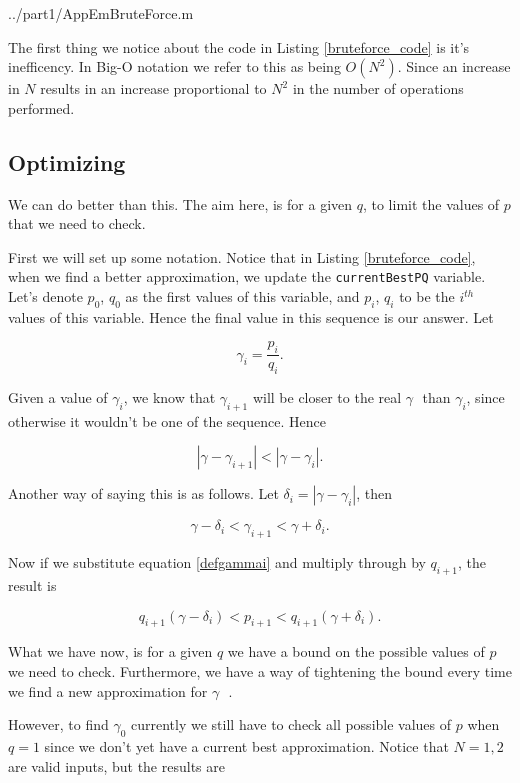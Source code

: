 \documentclass[10pt]{article}
\newcommand*{\gam}{$\gamma \text{ }$}
\newcommand*{\gami}{$\gamma_{i}$}
\begin{document}
   {../part1/AppEmBruteForce.m}

The first thing we notice about the code in Listing \ref{bruteforce_code} is it's inefficency. In Big-O notation we refer to this as being $O(N^2)$. Since an increase in $N$ results in an increase proportional to $N^2$ in the number of operations performed.

\subsection{Optimizing}
We can do better than this. The aim here, is for a given $q$, to limit the values of $p$ that we need to check. 

First we will set up some notation. Notice that in Listing \ref{bruteforce_code}, when we find a better approximation, we update the \texttt{currentBestPQ} variable. Let's denote $p_0$, $q_0$  as the first values of this variable, and $p_i$, $q_i$ to be the $i^{th}$ values of this variable. Hence the final value in this sequence is our answer. Let

\begin{equation} \label{defgammai}
  \gamma_i = \frac{p_i}{q_i}.
\end{equation}


Given a value of \gami, we know that $\gamma_{i+1}$ will be closer to the real \gam than \gami, since otherwise it wouldn't be one of the sequence. Hence

$$ |\gamma- \gamma_{i+1}| < |\gamma - \gamma_{i}| .$$

Another way of saying this is as follows. Let $\delta_{i} = | \gamma - \gamma_i  |$, then

$$ \gamma - \delta_i < \gamma_{i+1} < \gamma + \delta_i .$$

Now if we substitute equation \ref{defgammai} and multiply through by $q_{i+1}$, the result is

\begin{equation} \label{em_constraint}
q_{i+1} (\gamma - \delta_i) < p_{i+1} < q_{i+1} ( \gamma + \delta_i ).
\end{equation} 

What we have now, is for a given $q$ we have a bound on the possible values of $p$ we need to check. Furthermore, we have a way of tightening the bound every time we find a new approximation for \gam.

However, to find $\gamma_0$ currently we still have to check all possible values of $p$ when $q = 1$ since we don't yet have a current best approximation. Notice that $N = 1,2$ are valid inputs, but the results are
\end{document}

